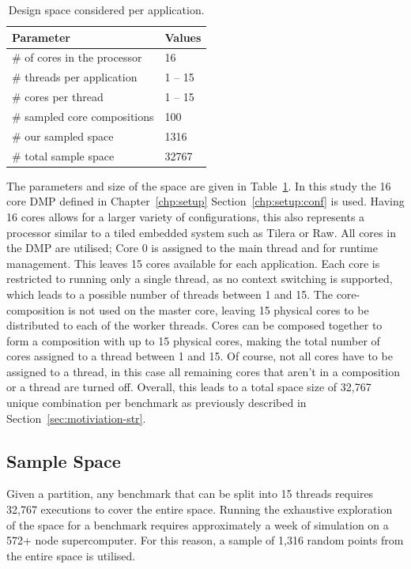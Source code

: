 \begin{table}[t]
\centering
\begin{tabular} { p{5.2cm}  p{1.8cm} }
      \toprule
      \textbf{Parameter} & \textbf{Values} \\ \midrule
      \# of cores in the processor & 16 \\
      \# threads per application & 1 -- 15 \\
      \# cores per thread & 1 -- 15 \\ \midrule
      \# sampled core compositions & 100 \\ 
      \# our sampled space & 1316 \\
      \# total sample space & 32767 \\ \bottomrule
    \end{tabular}
  \caption{Design space considered per application.}
  \label{tab:space}
\end{table}

The parameters and size of the space are given in Table~\ref{tab:space}.
In this study the 16 core DMP defined in Chapter~\ref{chp:setup} Section~\ref{chp:setup:conf} is used.
Having 16 cores allows for a larger variety of configurations, this also represents a processor similar to a tiled embedded system such as Tilera or Raw.
All cores in the DMP are utilised; Core 0 is assigned to the main thread and for runtime management.
This leaves 15 cores available for each application.
Each core is restricted to running only a single thread, as no context switching is supported, which leads to a possible number of threads between 1 and 15.
The core-composition is not used on the master core, leaving 15 physical cores to be distributed to each of the worker threads.
Cores can be composed together to form a composition with up to 15 physical cores, making the total number of cores assigned to a thread between 1 and 15.
Of course, not all cores have to be assigned to a thread, in this case all remaining cores that aren't in a composition or a thread are turned off.
Overall, this leads to a total space size of 32,767 unique combination per benchmark as previously described in Section~\ref{sec:motiviation-str}.

\subsection{Sample Space}

Given a partition, any benchmark that can be split into 15 threads requires 32,767 executions to cover the entire space.
Running the exhaustive exploration of the space for a benchmark requires approximately a week of simulation on a 572+ node supercomputer.
For this reason, a sample of 1,316 random points from the entire space is utilised.

